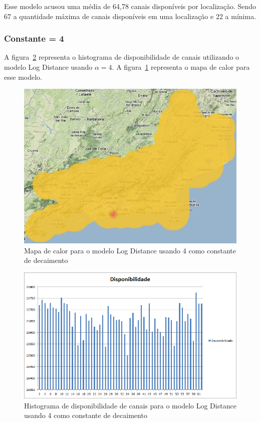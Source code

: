 Esse modelo acusou uma média de 64,78 canais disponíveis por localização. Sendo 67 a quantidade máxima de canais disponíveis em uma localização e 22 a mínima.

\subsubsection{Constante = 4}

A figura~\ref{fig:histogramalogdist4} representa o histograma de disponibilidade de canais utilizando o modelo Log Distance usando \begin{math}\alpha= 4 \end{math}. A figura~\ref{fig:LogDist4heatmap} representa o mapa de calor para esse modelo.

\begin{figure}[htb]
\centering
\includegraphics[width=1.0\textwidth]{figs/logdist4heatmap}
\caption[Mapa de calor para o modelo Log Distance usando 4 como constante de decaimento]
{Mapa de calor para o modelo Log Distance usando 4 como constante de decaimento }
\label{fig:LogDist4heatmap}
\end{figure} 

\begin{figure}[htb]
\centering
\includegraphics[width=1.0\textwidth]{figs/histogramalogdist4}
\caption[Histograma de disponibilidade de canais para o modelo Log Distance usando 4 como constante de decaimento]
{Histograma de disponibilidade de canais para o modelo Log Distance usando 4 como constante de decaimento}
\label{fig:histogramalogdist4}
\end{figure} 


